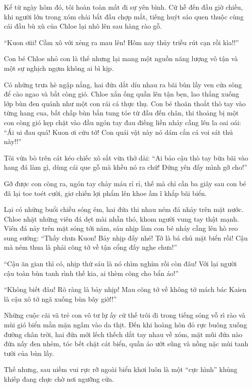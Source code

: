 \documentclass[../main.tex]{subfiles}
\begin{document}
Kể từ ngày hôm đó, tôi hoàn toàn mất đi sự yên bình. Cứ hễ đến đầu giờ chiều, khi người lớn trong xóm chài bắt đầu chợp mắt, tiếng huýt sáo quen thuộc cùng cái đầu bù xù của Chloe lại nhô lên sau hàng rào gỗ.

``Kuon ơiii! Cầm xô với xẻng ra mau lên! Hôm nay thủy triều rút cạn rồi kìa!!''

Con bé Chloe nhỏ con là thế nhưng lại mang một nguồn năng lượng vô tận và một sự nghịch ngợm không ai bì kịp.

Có những trưa hè ngập nắng, hai đứa dắt díu nhau ra bãi bùn lầy ven cửa sông để cào ngao và bắt còng gió. Chloe xắn ống quần lên tận bẹn, lao thẳng xuống lớp bùn đen quánh như một con rái cá thực thụ. Con bé thoăn thoắt thò tay vào từng hang cua, bất chấp bùn bắn tung tóe từ đầu đến chân, thi thoảng bị một con còng gió kẹp chặt vào đầu ngón tay đau điếng liền nhảy cẫng lên la oai oái: ``Ái ui đau quá! Kuon ơi cứu tớ! Con quái vật này nó dám cắn cá voi sát thủ này!!''

Tôi vừa bò trên cát kéo chiếc xô sắt vừa thở dài: ``Ai bảo cậu thò tay bừa bãi vào hang đá làm gì, dùng cái que gỗ mà khều nó ra chứ! Đứng yên đấy mình gỡ cho!''

Gỡ được con còng ra, ngón tay chảy máu rỉ rỉ, thế mà chỉ cần ba giây sau con bé đã lại toe toét cười, giơ chiến lợi phẩm lên khoe ầm ĩ khắp bãi biển.

Lại có những buổi chiều sóng êm, hai đứa thi nhau ném đá nhảy trên mặt nước. Chloe nhặt những viên đá dẹt mài nhẵn thó, khom người vung tay thật mạnh. Viên đá nảy trên mặt sóng tới năm, sáu nhịp làm con bé nhảy cẫng lên hò reo sung sướng: ``Thấy chưa Kuon! Bảy nhịp đấy nhé! Tớ là bá chủ mặt biển rồi! Cậu mà ném thua là phải cõng tớ về tận cổng đấy nghe chưa!''

``Cậu ăn gian thì có, nhịp thứ sáu là nó chìm nghỉm rồi còn đâu! Với lại người cậu toàn bùn tanh rình thế kia, ai thèm cõng cho bẩn áo!''

``Không biết đâu! Rõ ràng là bảy nhịp! Mau cõng tớ về không tớ mách bác Kaien là cậu xô tớ ngã xuống bùn bây giờ!!''

Những cuộc cãi vã trẻ con vô tư lự ấy cứ thế trôi đi trong tiếng sóng vỗ rì rào và mùi gió biển mằn mặn ngấm vào da thịt. Đến khi hoàng hôn đỏ rực buông xuống đường chân trời, hai đứa mới lếch thếch dắt tay nhau về xóm, mặt mũi đứa nào đứa nấy đen nhẻm, tóc bết chặt cát biển, quần áo ướt sũng và nồng nặc mùi tanh tưởi của bùn lầy.

Thế nhưng, sau niềm vui rực rỡ ngoài biển khơi luôn là một ``cực hình'' khủng khiếp đang chực chờ nơi ngưỡng cửa.
\end{document}
